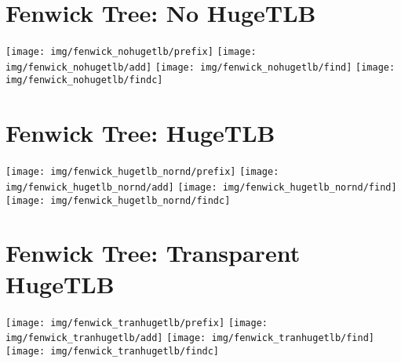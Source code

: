 \documentclass{article}
\begin{document}
\section*{Fenwick Tree: No HugeTLB}

\begin{center}
\texttt{[image: img/fenwick\_nohugetlb/prefix]}
\texttt{[image: img/fenwick\_nohugetlb/add]}
\texttt{[image: img/fenwick\_nohugetlb/find]}
\texttt{[image: img/fenwick\_nohugetlb/findc]}
\end{center}

\section*{Fenwick Tree: HugeTLB}

\begin{center}
\texttt{[image: img/fenwick\_hugetlb\_nornd/prefix]}
\texttt{[image: img/fenwick\_hugetlb\_nornd/add]}
\texttt{[image: img/fenwick\_hugetlb\_nornd/find]}
\texttt{[image: img/fenwick\_hugetlb\_nornd/findc]}
\end{center}

%

\section*{Fenwick Tree: Transparent HugeTLB}

\begin{center}
\texttt{[image: img/fenwick\_tranhugetlb/prefix]}
\texttt{[image: img/fenwick\_tranhugetlb/add]}
\texttt{[image: img/fenwick\_tranhugetlb/find]}
\texttt{[image: img/fenwick\_tranhugetlb/findc]}
\end{center}
\end{document}
